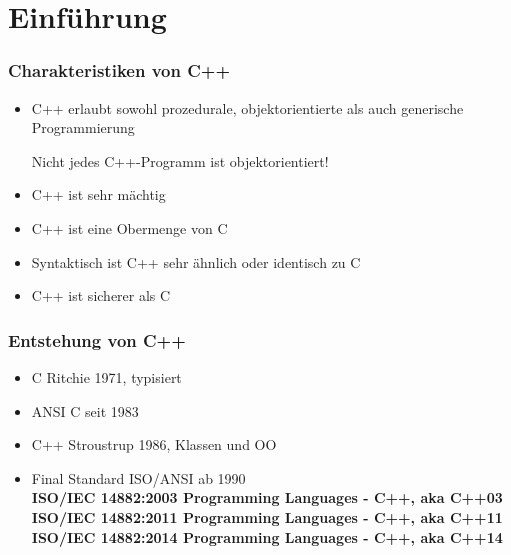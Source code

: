 
\part{Einführung}
\section{Charakteristiken von C++}
\begin{itemize}
	\item C++ erlaubt sowohl prozedurale, objektorientierte als auch generische Programmierung\\
	\begin{achtung}
		Nicht jedes C++-Programm ist objektorientiert!
	\end{achtung}
	\item C++ ist sehr mächtig
	\item C++ ist eine Obermenge von C
	\item Syntaktisch ist C++ sehr ähnlich oder identisch zu C
	\item C++ ist sicherer als C
\end{itemize}

\section{Entstehung von C++}
\begin{itemize}
	\item C Ritchie 1971, typisiert
	\item ANSI C seit 1983
	\item C++ Stroustrup 1986, Klassen und OO
	\item Final Standard ISO/ANSI 	ab 1990 
	\vspace{3mm}
	\\ \textbf{ISO/IEC 14882:2003 Programming Languages - C++, aka C++03} 			
	\vspace{3mm}
	\\ \textbf{ISO/IEC 14882:2011 Programming Languages - C++, aka C++11}
	\vspace{3mm}
	\\ \textbf{ISO/IEC 14882:2014 Programming Languages - C++, aka C++14}
\end{itemize}

